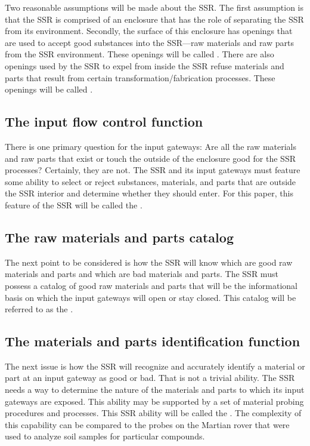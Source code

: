 Two reasonable assumptions will be made about the SSR. The first assumption is
that the SSR is
comprised of an enclosure that has the role of separating the SSR from its
environment. Secondly, the surface of this enclosure has
openings that are used to accept good
substances into the SSR---raw materials and raw parts from the SSR environment. 
These openings will be called . There are also
openings used by the SSR to expel from inside the SSR refuse materials
and parts that result from certain transformation/fabrication processes.
These openings will be called .

\subsection{The input flow control function}

There is one primary question
for the input gateways: Are all the raw materials and raw parts that
exist or touch the outside of the enclosure good for the SSR processes?
Certainly, they are not. The SSR and its input gateways must feature some
ability to select or reject substances, materials,
and parts that are outside the SSR interior and determine whether they should enter. 
For this paper, this feature of the SSR will be called the .

\subsection{The raw materials and parts catalog}

The next point to be considered
is how the SSR will know which are good raw materials and parts
and which are bad materials and parts. The SSR must
possess a catalog of good raw materials and parts that will be the
informational basis on which the input gateways will open or stay
closed. This catalog will be referred to as the .

\subsection{The materials and parts identification function}

The next issue is how the SSR
will recognize and accurately identify a material or part at an input
gateway as good or bad. That is not a trivial ability. 
The SSR needs a way to
determine the nature of the materials and parts 
to which its input gateways are exposed.
This ability may be supported by a set of material probing
procedures and processes. This SSR ability will be called the
. 
The complexity of this capability can be compared to the probes on the Martian rover that were used to analyze soil samples for particular compounds.

